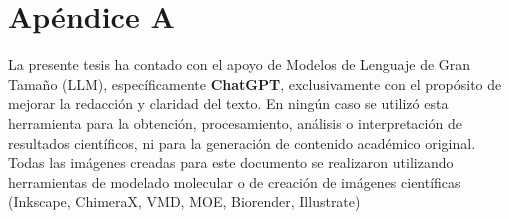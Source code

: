 \chapter{Apéndice A}
\label{chap: Appendix A}

La presente tesis ha contado con el apoyo de Modelos de Lenguaje de Gran Tamaño (LLM), específicamente \textbf{ChatGPT}, exclusivamente con el propósito de mejorar la redacción y claridad del texto. En ningún caso se utilizó esta herramienta para la obtención, procesamiento, análisis o interpretación de resultados científicos, ni para la generación de contenido académico original.
Todas las imágenes creadas para este documento se realizaron utilizando herramientas de modelado molecular o de creación de imágenes científicas (Inkscape, ChimeraX, VMD, MOE, Biorender, Illustrate)

